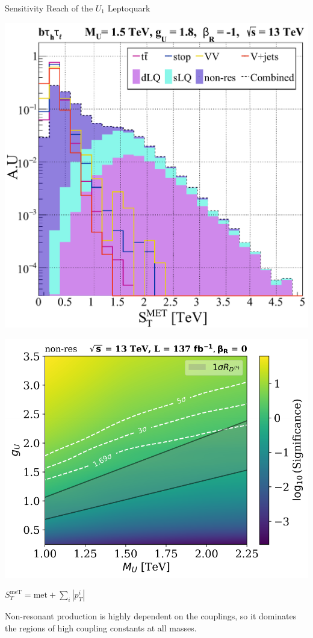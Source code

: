\documentclass{../bredelebeamer}
\begin{document}
\begin{frame}{Sensitivity Reach of the $U_1$ Leptoquark}
	\begin{minipage}{.48\linewidth}
			\includegraphics[width=.65\linewidth]{../2023_paper/sTTeV_semileptonic_sLQ_wRHC.pdf}

	\end{minipage}
	\begin{minipage}{.48\linewidth}
		\includegraphics[width=\linewidth]{../2023_paper/Significance_Heatmap_13TeV_L137_non-res_combined_woRHC.pdf}


	\end{minipage}
$S_T^{\text{meT}}=\text{met} + \sum_i\left|p_{T}^i\right|$
	{\large

		  Non-resonant production is highly dependent on the couplings, so it dominates the regions of high coupling constants at all masses.
	}
\end{frame}
\end{document}
